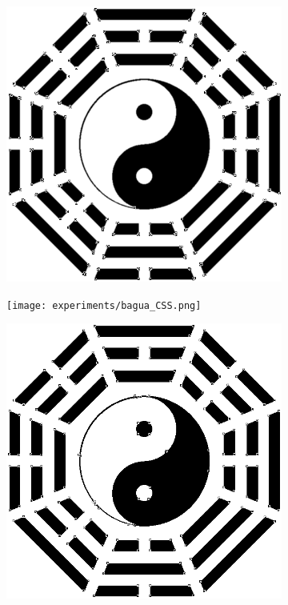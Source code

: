 \documentclass{article}
\begin{document}
\begin{figure}[h]
      \centering
    \begin{subfigure}[b]{0.24\linewidth}
      \includegraphics[width=\linewidth]{experiments/bagua_harris.png}
      \caption{}
    \end{subfigure}
         \begin{subfigure}[b]{0.24\linewidth}
      \texttt{[image: experiments/bagua\_CSS.png]}
      \caption{}
    \end{subfigure}
        \begin{subfigure}[b]{0.24\linewidth}
      \includegraphics[width=\linewidth]{experiments/bagua_RCSS.png}

\end{subfigure}
\end{figure}
\end{document}
